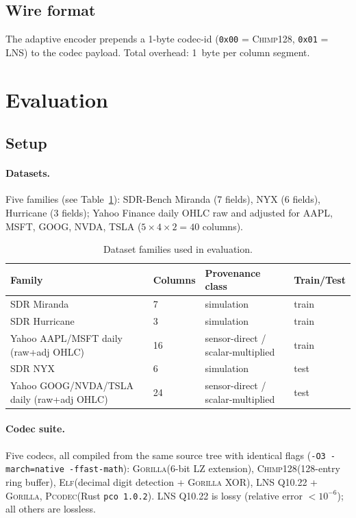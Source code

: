 \documentclass[sigconf]{acmart}
\newcommand{\gorilla}{\textsc{Gorilla}\xspace}
\newcommand{\chimp}{\textsc{Chimp128}\xspace}
\newcommand{\elf}{\textsc{Elf}\xspace}
\newcommand{\pcodec}{\textsc{Pcodec}\xspace}
\begin{document}
\subsection{Wire format}

The adaptive encoder prepends a 1-byte codec-id (\texttt{0x00} = \chimp,
\texttt{0x01} = LNS) to the codec payload.  Total overhead: 1~byte per
column segment.

\section{Evaluation}
\label{sec:eval}

\subsection{Setup}

\paragraph{Datasets.}
Five families (see Table~\ref{tab:datasets}): SDR-Bench Miranda (7 fields),
NYX (6 fields), Hurricane (3 fields); Yahoo Finance daily OHLC raw and
adjusted for AAPL, MSFT, GOOG, NVDA, TSLA ($5 \times 4 \times 2 = 40$ columns).

\begin{table}[h]
\centering
\caption{Dataset families used in evaluation.}
\label{tab:datasets}
\begin{tabular}{llll}
\toprule
Family & Columns & Provenance class & Train/Test \\
\midrule
SDR Miranda   & 7  & simulation          & train \\
SDR Hurricane & 3  & simulation          & train \\
Yahoo AAPL/MSFT daily (raw+adj OHLC) & 16 & sensor-direct / scalar-multiplied & train \\
SDR NYX       & 6  & simulation          & test \\
Yahoo GOOG/NVDA/TSLA daily (raw+adj OHLC) & 24 & sensor-direct / scalar-multiplied & test \\
\bottomrule
\end{tabular}
\end{table}

\paragraph{Codec suite.}
Five codecs, all compiled from the same source tree with identical flags
(\texttt{-O3 -march=native -ffast-math}):
\gorilla (6-bit LZ extension), \chimp (128-entry ring buffer),
\elf (decimal digit detection + \gorilla XOR),
LNS Q10.22 + \gorilla, \pcodec (Rust \texttt{pco 1.0.2}).
LNS Q10.22 is lossy (relative error $< 10^{-6}$); all others are lossless.
\end{document}
